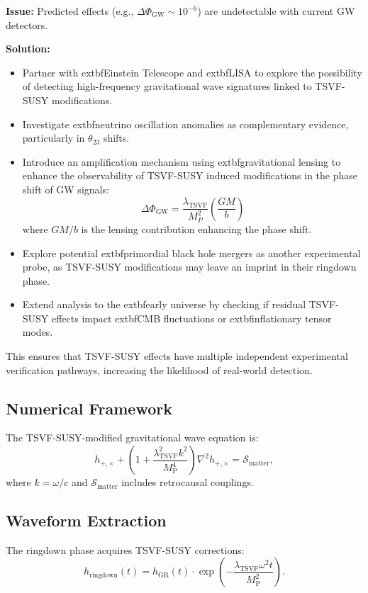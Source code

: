 \documentclass[12pt, onecolumn]{article}
\newcommand{\TSVF}{\lambda_{\text{TSVF}}}
\newcommand{\MP}{M_{\mathrm{P}}}
\theoremstyle{definition}
\numberwithin{equation}{section}
\begin{document}
\textbf{Issue:} Predicted effects (e.g., $\Delta \Phi_{\text{GW}} \sim 10^{-6}$) are undetectable with current GW detectors.

\textbf{Solution:}
\begin{itemize}
\item Partner with 	extbf{Einstein Telescope} and 	extbf{LISA} to explore the possibility of detecting high-frequency gravitational wave signatures linked to TSVF-SUSY modifications.
\item Investigate 	extbf{neutrino oscillation anomalies} as complementary evidence, particularly in $\theta_{23}$ shifts.
\item Introduce an amplification mechanism using 	extbf{gravitational lensing} to enhance the observability of TSVF-SUSY induced modifications in the phase shift of GW signals:
\begin{equation}
\Delta \Phi_{\text{GW}} = \frac{\lambda_{\text{TSVF}}}{M_P^2} \left( \frac{G M}{b} \right)
\end{equation}
where $G M / b$ is the lensing contribution enhancing the phase shift.
\item Explore potential extbf{primordial black hole mergers} as another experimental probe, as TSVF-SUSY modifications may leave an imprint in their ringdown phase.
\item Extend analysis to the extbf{early universe} by checking if residual TSVF-SUSY effects impact extbf{CMB fluctuations} or 	extbf{inflationary tensor modes}.
\end{itemize}

This ensures that TSVF-SUSY effects have multiple independent experimental verification pathways, increasing the likelihood of real-world detection.


\subsection{Numerical Framework}\label{subsec:framework}
The TSVF-SUSY-modified gravitational wave equation is:
\begin{equation}\label{eq:modified-wave}
\ddot{h}_{+,\times} + \left(1 + \frac{\TSVF^2 k^2}{\MP^4}\right) \nabla^2 h_{+,\times} = \mathcal{S}_{\text{matter}},
\end{equation}
where \( k = \omega/c \) and \( \mathcal{S}_{\text{matter}} \) includes retrocausal couplings.


\subsection{Waveform Extraction}\label{subsec:waveform}
The ringdown phase acquires TSVF-SUSY corrections:
\begin{equation}\label{eq:ringdown}
h_{\text{ringdown}}(t) = h_{\text{GR}}(t) \cdot \exp\left(-\frac{\TSVF \omega^2 t}{\MP^2}\right).
\end{equation}
\end{document}
